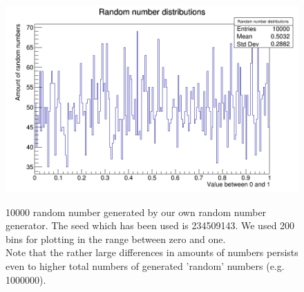 \documentclass[10pt]{article}
\newenvironment{myfont}{\fontfamily{put}\selectfont}{\par}
\begin{document}
\begin{myfont}
\begin{figure}[H]
  \centering
  \caption{\num{10000} random number generated by our own random number generator.
  The seed which has been used is \num{234509143}.
  We used \num{200} bins for plotting in the range between zero and one. \\
  Note that the rather large differences in amounts of numbers persists even to higher total numbers of generated 'random' numbers (e.g. \num{1000000}).}
  \includegraphics[width = \textwidth]{./canvas.png}
  \label{fig:ex_1_results}
\end{figure}

\end{myfont}
\end{document}
